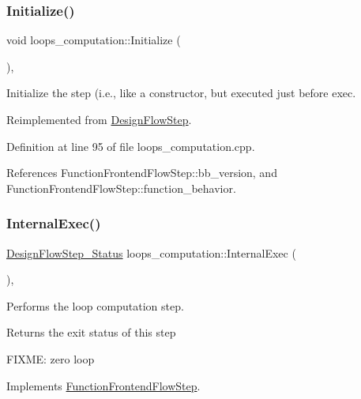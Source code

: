 \subsubsection{\texorpdfstring{Initialize()}{Initialize()}}
{\footnotesize\ttfamily void loops\+\_\+computation\+::\+Initialize (\begin{DoxyParamCaption}{ }\end{DoxyParamCaption})\hspace{0.3cm}{\ttfamily [override]}, {\ttfamily [virtual]}}



Initialize the step (i.\+e., like a constructor, but executed just before exec. 



Reimplemented from \hyperlink{classDesignFlowStep_a44b50683382a094976e1d432a7784799}{Design\+Flow\+Step}.



Definition at line 95 of file loops\+\_\+computation.\+cpp.



References Function\+Frontend\+Flow\+Step\+::bb\+\_\+version, and Function\+Frontend\+Flow\+Step\+::function\+\_\+behavior.

\mbox{\label{classloops__computation_ad50436ee7a9e468bec203289151bd096}} 
\subsubsection{\texorpdfstring{Internal\+Exec()}{InternalExec()}}
{\footnotesize\ttfamily \hyperlink{design__flow__step_8hpp_afb1f0d73069c26076b8d31dbc8ebecdf}{Design\+Flow\+Step\+\_\+\+Status} loops\+\_\+computation\+::\+Internal\+Exec (\begin{DoxyParamCaption}{ }\end{DoxyParamCaption})\hspace{0.3cm}{\ttfamily [override]}, {\ttfamily [virtual]}}



Performs the loop computation step. 

\begin{DoxyReturn}{Returns}
the exit status of this step 
\end{DoxyReturn}
F\+I\+X\+ME\+: zero loop 

Implements \hyperlink{classFunctionFrontendFlowStep_a00612f7fb9eabbbc8ee7e39d34e5ac68}{Function\+Frontend\+Flow\+Step}.



